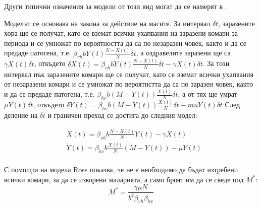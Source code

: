 \begin{remark}
Други типични означения за модели от този вид могат да се намерят в \cite{Smith2012}.
\end{remark}

Моделът се основава на закона за действие на масите.
За интервал $\delta t$, заразените хора ще се получат, като се вземат всички ухапвания на заразени комари за периода и се умножат по вероятността да са по незаразен човек, както и да се предаде патогена, т.е. $\beta_{vh} b Y(t) \frac{N-X(t)}{N} \delta t$, а оздравелите заразени ще са $\gamma X(t) \delta t$, откъдето $\delta X(t) = \beta_{vh} b Y(t) \frac{N-X(t)}{N} \delta t - \gamma X(t) \delta t$.
За този интервал пък заразените комари ще се получат, като се вземат всички ухапвания от незаразени комари и се умножат по вероятнстта да са по заразен човек, както и да се предаде патогена, т.е. $\beta_{hv} b (M - Y(t)) \frac{X(t)}{N} \delta t$, а от тях ще умрат $\mu Y(t) \delta t$, откъдето $\delta Y(t) = \beta_{hv} b (M - Y(t)) \frac{X(t)}{N} \delta t - mu Y(t) \delta t$ След деление на $\delta t$ и граничен преход се достига до следния модел:

\begin{equation}
  \label{eq:BasicProblem}
  \begin{split}
    &\dot{X}(t) = \beta_{vh} b \frac{N-X(t)}{N} Y(t) - \gamma X(t) \\
    &\dot{Y}(t) = \beta_{hv} b \frac{X(t)}{N} (M-Y(t)) - \mu Y(t) \\
  \end{split}
\end{equation}

С помощта на модела Ross показва, че не е необходимо да бъдат изтребени всички комари, за да се изкорени маларията, а само броят им да се сведе под $M^*$:
\begin{equation}
  \label{eq:RossM}
  M^* = \frac{\gamma \mu N}{b^2 \beta_{vh} \beta_{hv}}
\end{equation}


